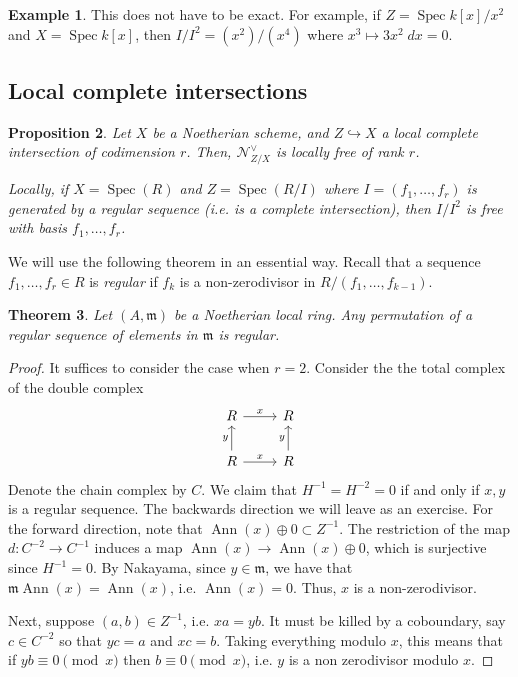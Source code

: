 \documentclass[10pt]{article}
\newtheorem{thm}{Theorem}[section]
\newtheorem{prop}[thm]{Proposition}
\theoremstyle{definition}
\newtheorem{exmp}[thm]{Example}
\DeclareMathOperator{\Spec}{Spec}
\newcommand{\mf}{\mathfrak}
\DeclareMathOperator{\Ann}{Ann}
\begin{document}
\begin{exmp}
This does not have to be exact.  For example, if $Z = \Spec k[x]/x^2$ and $X = \Spec k[x]$, then $I/I^2 = (x^2)/(x^4)$ where $x^3 \mapsto 3x^2 \; dx = 0$.
\end{exmp}



\subsection{Local complete intersections} 


\begin{prop}
Let $X$ be a Noetherian scheme, and $Z \hookrightarrow X$ a local complete intersection of codimension $r$.  Then, $\mathcal{N}^\vee_{Z/X}$ is locally free of rank $r$.

Locally, if $X = \Spec(R)$ and $Z = \Spec(R/I)$ where $I = (f_1, \ldots, f_r)$ is generated by a regular sequence (i.e. is a complete intersection), then $I/I^2$ is free with basis $f_1, \ldots, f_r$.
\end{prop}


We will use the following theorem in an essential way.  Recall that a sequence $f_1, \ldots, f_r \in R$ is \emph{regular} if $f_k$ is a non-zerodivisor in $R/(f_1, \ldots, f_{k-1})$.
\begin{thm}
Let $(A, \mf{m})$ be a Noetherian local ring.  Any permutation of a regular sequence of elements in $\mf{m}$ is regular.
\end{thm}
\begin{proof}
It suffices to consider the case when $r=2$.  Consider the the total complex of the double complex
$$\begin{tikzcd}
R \arrow[r, "x"] & R \\
R \arrow[r, "x"] \arrow[u, "y"] & R \arrow[u, "y"]
\end{tikzcd}$$
Denote the chain complex by $C$.  We claim that $H^{-1} = H^{-2} = 0$ if and only if $x, y$ is a regular sequence.    The backwards direction we will leave as an exercise.  For the forward direction, note that $\Ann(x) \oplus 0 \subset Z^{-1}$.  The restriction of the map $d: C^{-2} \rightarrow C^{-1}$ induces a map $\Ann(x) \rightarrow \Ann(x) \oplus 0$, which is surjective since $H^{-1} = 0$.  By Nakayama, since $y \in \mf{m}$, we have that $\mf{m}\Ann(x) = \Ann(x)$, i.e. $\Ann(x) = 0$.  Thus, $x$ is a non-zerodivisor.

Next, suppose $(a, b) \in Z^{-1}$, i.e. $xa = yb$.  It must be killed by a coboundary, say $c \in C^{-2}$ so that $yc = a$ and $xc = b$.  Taking everything modulo $x$, this means that if $yb \equiv 0 \pmod{x}$ then $b \equiv 0 \pmod{x}$, i.e. $y$ is a non zerodivisor modulo $x$.
\end{proof}
\end{document}

